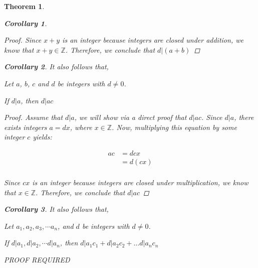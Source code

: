 \documentclass{book}
\newtheorem{theorem}{Theorem}[section]
\newtheorem{corollary}{Corollary}[theorem]
\theoremstyle{definition}
\theoremstyle{remark}
\newcommand{\bb}[1]{\mathbb{#1}}
\begin{document}
\begin{theorem}
\begin{corollary}
\begin{proof}
        Since $x + y$ is an integer because integers are closed under addition, we know that $x + y \in \bb{Z}$. Therefore, we conclude that $d | (a + b)$ 
    \end{proof}
\end{corollary}
    
\bigskip
\begin{corollary}
It also follows that, 
    \begin{tcolorbox}
        Let $a$, $b$, $c$ and $d$ be integers with $d \neq 0$. 
        \begin{center}
            If $d | a$, then $d | ac$
        \end{center}
    \end{tcolorbox}

    \begin{proof}
        Assume that $d | a$, we will show via a direct proof that $d | ac$. Since $d | a$, there exists integers $a = dx$, where $x \in \bb{Z}$. Now, multiplying this equation by some integer $c$ yields: 

            \begin{align*}	
            	ac & = dcx \\
            	    & = d(cx) \\
            \end{align*}

        Since $cx$ is an integer because integers are closed under multiplication, we know that $x \in \bb{Z}$. Therefore, we conclude that $d | ac$ 
    \end{proof}
\end{corollary}

\bigskip
\begin{corollary}
It also follows that, 
    \begin{tcolorbox}
        Let $a_1, a_2, a_3, \cdots a_n$, and  $d$ be integers with $d \neq 0$. 
        \begin{center}
            If $d|a_1, d|a_2, \cdots d|a_n$, then $d|a_1c_1 + d|a_2c_2 + \dots d|a_nc_n$
        \end{center}
    \end{tcolorbox}

    PROOF REQUIRED
\end{corollary}

\end{theorem}
\end{document}
